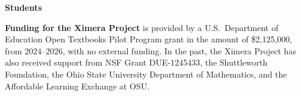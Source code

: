 \documentclass{techbrief}
\begin{document}
\begin{xframe}
    {\sffamily\bfseries Students} \lipsum[1]
\end{xframe}

\lipsum[1-6]

\restoregeometry

\lipsum[1-6]

\begin{xframe}
    \textbf{Funding for the Ximera Project} is provided by
    a U.S.\ Department of Education Open Textbooks Pilot Program grant in the
    amount of \$2,125,000, from 2024--2026, with no external funding. In the
    past, the Ximera Project has
    also received support from NSF Grant DUE-1245433, the Shuttleworth
    Foundation, the Ohio State University
    Department of Mathematics, and the Affordable Learning Exchange at OSU.
\end{xframe}
\end{document}
